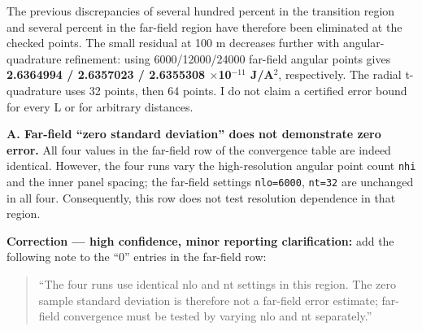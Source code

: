 \documentclass[10pt,a4paper]{article}
\begin{document}
{\par
The previous discrepancies of several hundred percent in the transition region and several percent in the far-field region have therefore been eliminated at the checked points. The small residual at 100 m decreases further with angular-quadrature refinement: using 6000/12000/24000 far-field angular points gives \textbf{2.6364994 / 2.6357023 / 2.6355308 $\times$10$^{-11}$ J/A$^2$}, respectively. The radial t-quadrature uses 32 points, then 64 points. I do not claim a certified error bound for every L or for arbitrary distances.
\par
\vspace{1.5pt}\par\vspace{0.5pt}
\par
\textbf{A. Far-field ``zero standard deviation'' does not demonstrate zero error.} All four values in the far-field row of the convergence table are indeed identical. However, the four runs vary the high-resolution angular point count \texttt{nhi} and the inner panel spacing; the far-field settings \texttt{nlo=6000}, \texttt{nt=32} are unchanged in all four. Consequently, this row does not test resolution dependence in that region.
\par
\textbf{Correction --- high confidence, minor reporting clarification:} add the following note to the ``0'' entries in the far-field row:
\par
\begin{quote}\vspace{-3pt}
``The four runs use identical nlo and nt settings in this region. The zero sample standard deviation is therefore not a far-field error estimate; far-field convergence must be tested by varying nlo and nt separately.''

\end{quote}
\par

}
\end{document}
